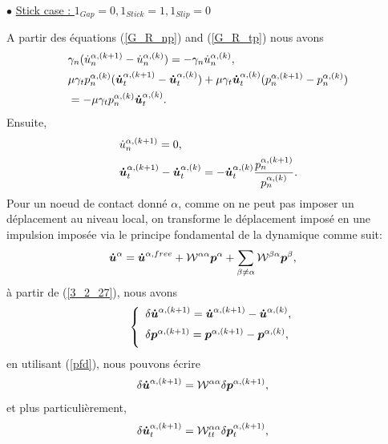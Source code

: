 $\bullet$ \underline{Stick case : ${1}_{Gap} =0, {1}_{Stick} = 1, {1}_{Slip} = 0$}

\noindent A partir des équations (\ref{G_R_np}) and (\ref{G_R_tp}) nous avons
\begin{align}
&\gamma_n(\dot{u}^{\alpha,(k+1)}_n-\dot{u}^{\alpha,(k)}_n)=-\gamma_n\dot{u}^{\alpha,(k)}_n,\\
& \mu \gamma_t p^{\alpha,(k)}_n(\boldsymbol{\dot{u}}^{\alpha,(k+1)}_t-\boldsymbol{\dot{u}}^{\alpha,(k)}_t)+\mu \gamma_t \boldsymbol{\dot{u}}^{\alpha,(k)}_t(p^{\alpha,(k+1)}_n-p^{\alpha,(k)}_n)\\
& = -\mu  \gamma_t p^{\alpha,(k)}_n\boldsymbol{\dot{u}}^{\alpha,(k)}_t.\nonumber
\end{align}
Ensuite, 
\begin{align}
&\dot{u}^{\alpha,(k+1)}_n=0, \\
& \boldsymbol{\dot{u}}^{\alpha,(k+1)}_t - \boldsymbol{\dot{u}}^{\alpha,(k)}_t = - \boldsymbol{\dot{u}}^{\alpha,(k)}_t \frac{p^{\alpha,(k+1)}_n}{p^{\alpha,(k)}_n}.\label{stick_2}
\end{align}
\noindent Pour un noeud de contact donné $ \alpha $, comme on ne peut pas imposer un déplacement au niveau local, on transforme le déplacement imposé en une impulsion imposée via le principe fondamental de la dynamique comme suit:
\begin{align}
&\boldsymbol{\dot{u}}^{\alpha} = \boldsymbol{\dot{u}}^{\alpha,free} + {\cal W}^{\alpha \alpha} \boldsymbol{p}^{\alpha} + \sum_{\beta \neq \alpha} {\cal W}^{\beta \alpha} \boldsymbol{p}^{\beta},\label{pfd}
\end{align}
\noindent à partir de (\ref{3_2_27}), nous avons
\begin{eqnarray}
&& \left\{\begin{array}{lll}
\delta \boldsymbol{\dot{u}}^{\alpha,(k+1)} = \boldsymbol{\dot{u}}^{\alpha,(k+1)} - \boldsymbol{\dot{u}}^{\alpha,(k)},\\[2mm]
\delta \boldsymbol{p}^{\alpha,(k+1)} = \boldsymbol{p}^{\alpha,(k+1)} - \boldsymbol{p}^{\alpha,(k)},\\[2mm]
\end{array}\right.
\label{iterate}
\end{eqnarray}
\noindent en utilisant (\ref{pfd}), nous pouvons écrire
\begin{align}
&\delta \boldsymbol{\dot{u}}^{\alpha,(k+1)} = {\cal W}^{\alpha \alpha} \delta \boldsymbol{p}^{\alpha,(k+1)},
\end{align}
\noindent et plus particulièrement,
\begin{align}
&\delta \boldsymbol{\dot{u}}_t^{\alpha,(k+1)} = {\cal W}^{\alpha \alpha}_{tt} \delta \boldsymbol{p}_t^{\alpha,(k+1)},
\end{align}
